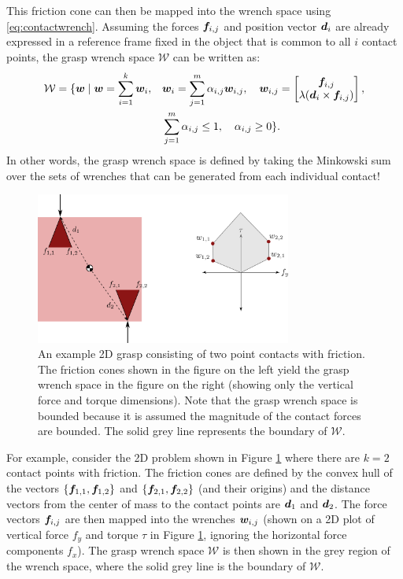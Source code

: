 \begin{example}
This friction cone can then be mapped into the wrench space using \eqref{eq:contactwrench}. Assuming the forces $\bm{f}_{i,j}$ and position vector $\bm{d}_i$ are already expressed in a reference frame fixed in the object that is common to all $i$ contact points, the grasp wrench space $\mathcal{W}$ can be written as:
\begin{equation*}
\begin{split}
\mathcal{W} = \{\bm{w} \mid \bm{w} = \sum_{i=1}^k \bm{w}_i, \quad &\bm{w}_i = \sum_{j=1}^m \alpha_{i,j}\bm{w}_{i,j}, \quad \bm{w}_{i,j} = \begin{bmatrix}
    \bm{f}_{i,j} \\ \lambda(\bm{d}_i \times \bm{f}_{i,j})
    \end{bmatrix}, \\
&\sum_{j=1}^m \alpha_{i,j} \leq 1, \quad \alpha_{i,j} \geq 0\}.    
\end{split}
\end{equation*}
In other words, the grasp wrench space is defined by taking the Minkowski sum over the sets of wrenches that can be generated from each individual contact!

\begin{figure}[ht]
\begin{center}
\includegraphics[width=0.75\textwidth]{tex/figs/ch26_figs/2Dexample_a.png}
\caption{An example 2D grasp consisting of two point contacts with friction. The friction cones shown in the figure on the left yield the grasp wrench space in the figure on the right (showing only the vertical force and torque dimensions). Note that the grasp wrench space is bounded because it is assumed the magnitude of the contact forces are bounded. The solid grey line represents the boundary of $\mathcal{W}$.}
\label{fig:2dgrasp_a}
\end{center}
\end{figure}
For example, consider the 2D problem shown in Figure \ref{fig:2dgrasp_a} where there are $k=2$ contact points with friction. The friction cones are defined by the convex hull of the vectors $\{\bm{f}_{1,1},\bm{f}_{1,2}\}$ and $\{\bm{f}_{2,1},\bm{f}_{2,2}\}$ (and their origins) and the distance vectors from the center of mass to the contact points are $\bm{d}_1$ and $\bm{d}_2$. The force vectors $\bm{f}_{i,j}$ are then mapped into the wrenches $\bm{w}_{i,j}$ (shown on a 2D plot of vertical force $f_y$ and torque $\tau$ in Figure \ref{fig:2dgrasp_a}, ignoring the horizontal force components $f_x$). 
The grasp wrench space $\mathcal{W}$ is then shown in the grey region of the wrench space, where the solid grey line is the boundary of $\mathcal{W}$.
\end{example}

